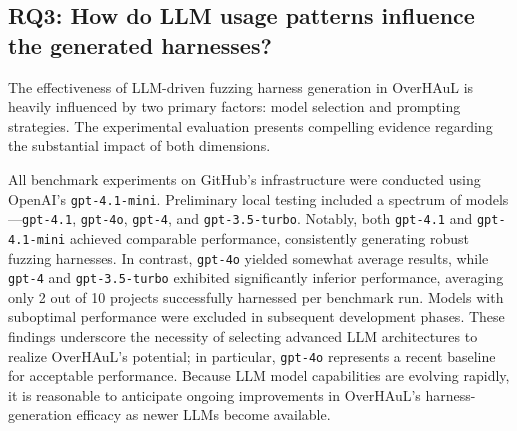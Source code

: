 \documentclass[
  a4paper,
]{scrreprt}
\newenvironment{Shaded}{\begin{snugshade}}{\end{snugshade}}
\newcommand{\ControlFlowTok}[1]{\textcolor[rgb]{0.85,0.12,0.09}{#1}}
\newcommand{\DataTypeTok}[1]{\textcolor[rgb]{0.47,0.16,0.63}{#1}}
\newcommand{\DecValTok}[1]{\textcolor[rgb]{0.47,0.16,0.63}{#1}}
\newcommand{\KeywordTok}[1]{\textcolor[rgb]{0.85,0.12,0.09}{#1}}
\newcommand{\NormalTok}[1]{\textcolor[rgb]{0.33,0.33,0.33}{#1}}
\newcommand{\OperatorTok}[1]{\textcolor[rgb]{0.00,0.46,0.62}{#1}}
\theoremstyle{definition}
\theoremstyle{remark}
\begin{document}
%

\subsection{RQ3: How do LLM usage patterns influence the generated
harnesses?}\label{rq3-how-do-llm-usage-patterns-influence-the-generated-harnesses}

The effectiveness of LLM-driven fuzzing harness generation in OverHAuL
is heavily influenced by two primary factors: model selection and
prompting strategies. The experimental evaluation presents compelling
evidence regarding the substantial impact of both dimensions.

All benchmark experiments on GitHub's infrastructure were conducted
using OpenAI's \texttt{gpt-4.1-mini}. Preliminary local testing included
a spectrum of models---\texttt{gpt-4.1}, \texttt{gpt-4o},
\texttt{gpt-4}, and \texttt{gpt-3.5-turbo}. Notably, both
\texttt{gpt-4.1} and \texttt{gpt-4.1-mini} achieved comparable
performance, consistently generating robust fuzzing harnesses. In
contrast, \texttt{gpt-4o} yielded somewhat average results, while
\texttt{gpt-4} and \texttt{gpt-3.5-turbo} exhibited significantly
inferior performance, averaging only 2 out of 10 projects successfully
harnessed per benchmark run. Models with suboptimal performance were
excluded in subsequent development phases. These findings underscore the
necessity of selecting advanced LLM architectures to realize OverHAuL's
potential; in particular, \texttt{gpt-4o} represents a recent baseline
for acceptable performance. Because LLM model capabilities are evolving
rapidly, it is reasonable to anticipate ongoing improvements in
OverHAuL's harness-generation efficacy as newer LLMs become available.
\end{document}
